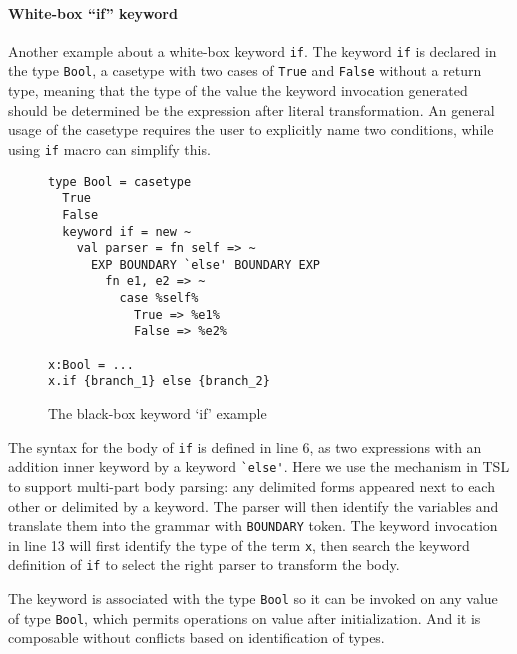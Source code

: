 \documentclass{sig-alternate}
\begin{document}
\paragraph{White-box ``if'' keyword}
Another example about a white-box keyword \verb|if|. The keyword \verb|if| is declared in the type \verb|Bool|, a casetype with two cases of \verb|True| and \verb|False| without a return type, meaning that the type of the value the keyword invocation generated should be determined be the expression after literal transformation. An general usage of the casetype requires the user to explicitly name two conditions, while using \verb|if| macro can simplify this.
\begin{figure}[ht]
\begin{lstlisting}[style=wyvern]
type Bool = casetype 
  True
  False
  keyword if = new ~
    val parser = fn self => ~
      EXP BOUNDARY `else' BOUNDARY EXP
        fn e1, e2 => ~
          case %self%
            True => %e1%
            False => %e2%

x:Bool = ...
x.if {branch_1} else {branch_2}
\end{lstlisting}
\vspace{-8px}
\caption{The black-box keyword `if' example}
\vspace{-10px}
\label{if-example}
\end{figure}

The syntax for the body of \verb|if| is defined in line 6, as two expressions with an addition inner keyword by a keyword \verb|`else'|. Here we use the mechanism in TSL to support multi-part body parsing: any delimited forms appeared next to each other or delimited by a keyword. The parser will then identify the variables and translate them into the grammar with \verb|BOUNDARY| token. The keyword invocation in line 13 will first identify the type of the term \verb|x|, then search the keyword definition of \verb|if| to select the right parser to transform the body. 

The keyword is associated with the type \verb|Bool| so it can be invoked on any value of type \verb|Bool|, which permits operations on value after initialization. And it is composable without conflicts based on identification of types. 
\end{document}
